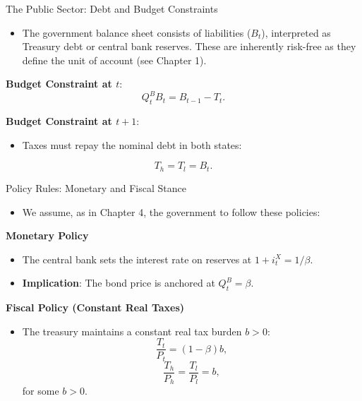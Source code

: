 \documentclass[11pt,aspectratio=169]{beamer}
\begin{document}
\begin{frame}{The Public Sector: Debt and Budget Constraints}
\small

\begin{itemize}
    \item The government balance sheet consists of liabilities ($B_t$), interpreted as Treasury debt or central bank reserves. These are inherently risk-free as they define the unit of account (see Chapter 1).
\end{itemize}
\vspace{0.2cm}
\textbf{Budget Constraint at $t$}:
\begin{equation}
Q_{t}^{B}B_{t}=B_{t-1}-T_{t}. \label{BC1}
\end{equation}

\textbf{Budget Constraint at $t+1$}:
\begin{itemize}
    \item Taxes must repay the nominal debt in both states:
\end{itemize}
\begin{equation}
T_{h}=T_{l}=B_{t}. \label{TaxesNoIntervention}
\end{equation}
\end{frame}

\begin{frame}{Policy Rules: Monetary and Fiscal Stance}
\small
\begin{itemize}
    \item We assume, as in Chapter 4, the government to follow these policies:
\end{itemize}

\vspace{0.2cm}
\textbf{Monetary Policy}
\begin{itemize}
    \item The central bank sets the interest rate on reserves at $1+i_{t}^{X}=1/\beta$.
    \item \textbf{Implication}: The bond price is anchored at $Q_{t}^{B}=\beta$.
\end{itemize}

\vspace{0.2cm}
\textbf{Fiscal Policy (Constant Real Taxes)}
\begin{itemize}
    \item The treasury maintains a constant real tax burden $b > 0$:
\begin{equation}
\frac{T_{t}}{P_{t}}=(1-\beta )b, \label{TaxS}
\end{equation}
\begin{equation}
\frac{T_{h}}{P_{h}}=\frac{T_{l}}{P_{l}}=b, \label{TaxL}
\end{equation}
for some $b>0$.
\end{itemize}

\end{frame}
\end{document}
